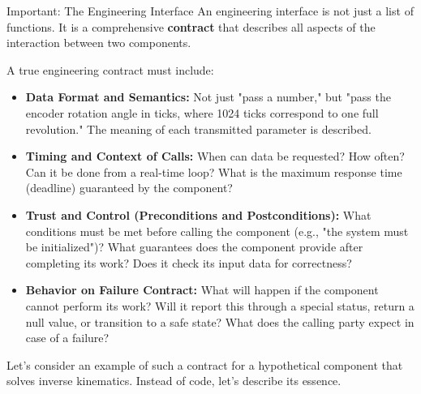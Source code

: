 \begin{principlebox}{Important: The Engineering Interface}
An engineering interface is not just a list of functions. It is a comprehensive \textbf{contract} that describes all aspects of the interaction between two components.
\end{principlebox}

A true engineering contract must include:
\begin{itemize}
    \item \textbf{Data Format and Semantics:} Not just "pass a number," but "pass the encoder rotation angle in ticks, where 1024 ticks correspond to one full revolution." The meaning of each transmitted parameter is described.
    \item \textbf{Timing and Context of Calls:} When can data be requested? How often? Can it be done from a real-time loop? What is the maximum response time (deadline) guaranteed by the component?
    \item \textbf{Trust and Control (Preconditions and Postconditions):} What conditions must be met before calling the component (e.g., "the system must be initialized")? What guarantees does the component provide after completing its work? Does it check its input data for correctness?
    \item \textbf{Behavior on Failure Contract:} What will happen if the component cannot perform its work? Will it report this through a special status, return a null value, or transition to a safe state? What does the calling party expect in case of a failure?
\end{itemize}

Let's consider an example of such a contract for a hypothetical component that solves inverse kinematics. Instead of code, let's describe its essence.

